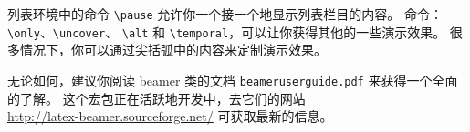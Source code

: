 
列表环境中的命令 \verb|\pause| 允许你一个接一个地显示列表栏目的内容。
命令：\verb|\only|、\verb|\uncover|、
\verb|\alt| 和 \verb|\temporal|，可以让你获得其他的一些演示效果。
很多情况下，你可以通过尖括弧中的内容来定制演示效果。


无论如何，建议你阅读 beamer 类的文档 \texttt{beameruserguide.pdf} 来获得一个全面的了解。
这个宏包正在活跃地开发中，去它们的网站\\
\href{http://latex-beamer.sourceforge.net/}{http://latex-beamer.sourceforge.net/}
可获取最新的信息。

